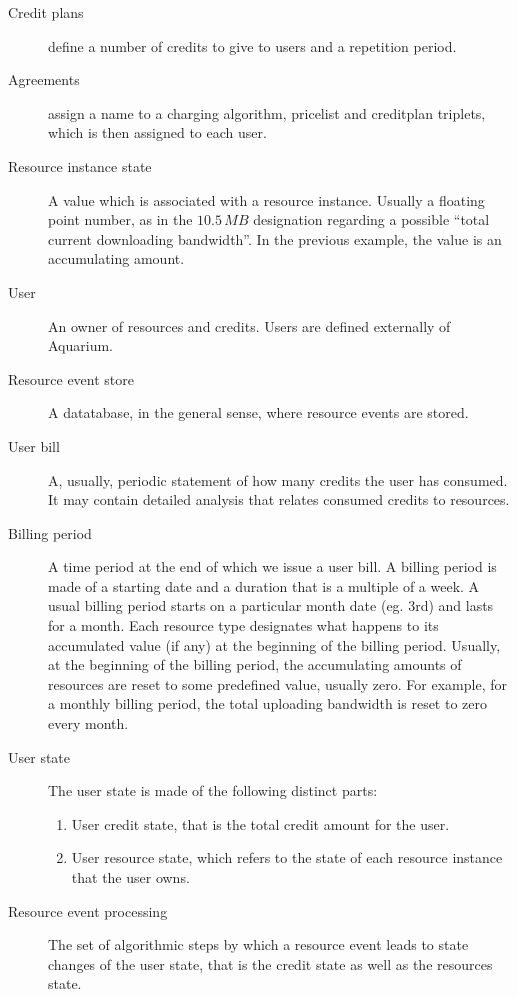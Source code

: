 \documentclass[preprint,10pt]{sigplanconf}
\newcommand{\MB}[1]{\ensuremath{#1\,MB}}
\begin{document}
\begin{description}
\item[Credit plans] define a number of credits to give to users and a repetition
        period.

\item[Agreements] assign a name to a charging algorithm, pricelist and creditplan triplets,
        which is then assigned to each user.
        

\item[Resource instance state]
A value which is associated with a resource instance. Usually a floating point number, as in the \MB{10.5} designation regarding a possible ``total current downloading bandwidth''. In the previous example, the value is an accumulating amount.

\item[User]
An owner of resources and credits. Users are defined externally of Aquarium.

\item[Resource event store]
A datatabase, in the general sense, where resource events are stored.

\item[User bill]
A, usually, periodic statement of how many credits the user has consumed. It may contain detailed analysis that relates consumed credits to resources.
  
\item[Billing period]
A time period at the end of which we issue a user bill.
A billing period is made of a starting date and a duration that is a multiple of a week.
A usual billing period starts on a particular month date (eg. 3rd) and lasts for a month.
Each resource type designates what happens to its accumulated value (if any) at the beginning of the billing period. Usually, at the beginning of the billing period, the accumulating amounts of resources are reset to some predefined value, usually zero. For example, for a monthly billing period, the total uploading bandwidth is reset to zero every month.
   
\item[User state]
The user state is made of the following distinct parts:
\begin{enumerate}
\item User credit state, that is the total credit amount for the user.

\item User resource state, which refers to the state of each resource instance that the user owns.
\end{enumerate}

\item[Resource event processing]
The set of algorithmic steps by which a resource event leads to state changes of the user state, that is the credit state as well as the resources state.

\end{description}
\end{document}
